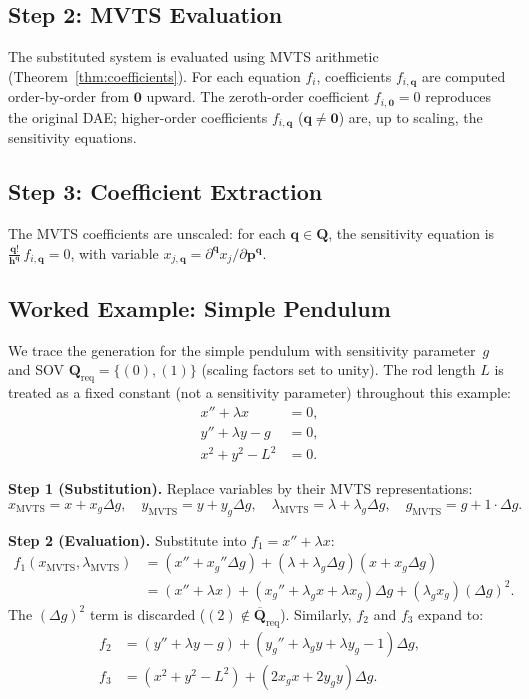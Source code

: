 \documentclass[12pt,a4paper]{article}
\theoremstyle{definition}
\theoremstyle{plain}
\theoremstyle{remark}
\newcommand{\vp}{\mathbf{p}}
\newcommand{\vq}{\mathbf{q}}
\newcommand{\vQ}{\mathbf{Q}}
\newcommand{\vh}{\mathbf{h}}
\newcommand{\vz}{\mathbf{0}}
\begin{document}
\subsection{Step 2: MVTS Evaluation}

The substituted system is evaluated using MVTS arithmetic (Theorem~\ref{thm:coefficients}). For each equation $f_i$, coefficients $f_{i,\vq}$ are computed order-by-order from $\vz$ upward. The zeroth-order coefficient $f_{i,\vz}=0$ reproduces the original DAE; higher-order coefficients $f_{i,\vq}$ ($\vq\neq\vz$) are, up to scaling, the sensitivity equations.

\subsection{Step 3: Coefficient Extraction}

The MVTS coefficients are unscaled: for each $\vq\in\vQ$, the sensitivity equation is $\frac{\vq!}{\vh^\vq}\,f_{i,\vq}=0$, with variable $x_{j,\vq} = \partial^{\vq}x_j/\partial\vp^{\vq}$.

\subsection{Worked Example: Simple Pendulum}

We trace the generation for the simple pendulum with sensitivity parameter~$g$ and SOV $\vQ_{\text{req}}=\{(0),(1)\}$ (scaling factors set to unity). The rod length $L$ is treated as a fixed constant (not a sensitivity parameter) throughout this example:
\begin{equation}\label{eq:pendulum}
  \begin{aligned}
    x'' + \lambda x &= 0,\\
    y'' + \lambda y - g &= 0,\\
    x^2 + y^2 - L^2 &= 0.
  \end{aligned}
\end{equation}

\textbf{Step 1 (Substitution).} Replace variables by their MVTS representations:
\[
  x_{\text{MVTS}} = x + x_g\Delta g,\quad
  y_{\text{MVTS}} = y + y_g\Delta g,\quad
  \lambda_{\text{MVTS}} = \lambda + \lambda_g\Delta g,\quad
  g_{\text{MVTS}} = g + 1\cdot\Delta g.
\]

\textbf{Step 2 (Evaluation).} Substitute into $f_1 = x'' + \lambda x$:
\begin{align*}
  f_1(x_{\text{MVTS}},\lambda_{\text{MVTS}})
  &= (x'' + x_g''\Delta g) + (\lambda + \lambda_g\Delta g)(x + x_g\Delta g)\\
  &= (x'' + \lambda x) + (x_g'' + \lambda_g x + \lambda x_g)\Delta g + (\lambda_g x_g)(\Delta g)^2.
\end{align*}
The $(\Delta g)^2$ term is discarded ($(2)\notin\overline{\vQ}_{\text{req}}$). Similarly, $f_2$ and $f_3$ expand to:
\begin{align*}
  f_2 &= (y''+\lambda y - g) + (y_g'' + \lambda_g y + \lambda y_g - 1)\Delta g,\\
  f_3 &= (x^2+y^2-L^2) + (2x_g x + 2y_g y)\Delta g.
\end{align*}
\end{document}
